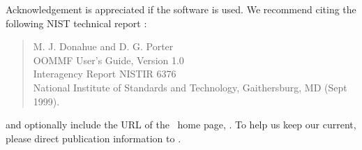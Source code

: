 Acknowledgement is appreciated if the software is used.  We recommend
citing the following NIST technical
report \cite{donahue1999}:
\begin{quote}
M. J. Donahue and D. G. Porter\\
OOMMF User's Guide, Version 1.0\\
Interagency Report NISTIR 6376\\
National Institute of Standards and Technology, Gaithersburg, MD (Sept 1999).
\end{quote}
and optionally include the URL of the \OOMMF\ home page,
.
To help us keep our 
current, please direct publication
information to {}.

\htmlinfo*
